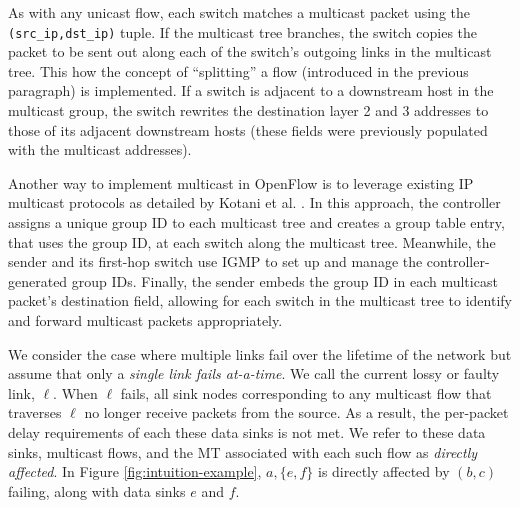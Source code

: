 As with any unicast flow, each switch matches a multicast packet using the {\tt(src\_ip,dst\_ip)} tuple.  If the multicast tree branches, the switch copies the packet 
to be sent out along each of the switch's outgoing links in the multicast tree.  This how the concept of ``splitting''  a flow (introduced in the previous paragraph) is implemented.
If a switch is adjacent to a downstream host in the multicast group, the switch rewrites the destination layer 2 and 3 addresses to those of its adjacent downstream hosts 
(these fields were previously populated with the multicast addresses). 

Another way to implement multicast in OpenFlow is to leverage existing IP multicast protocols as detailed by Kotani et al. \cite{Kotani12}.  
In this approach, the controller assigns a unique group ID to each multicast tree and creates a group table entry, that uses the group ID, at each switch along the multicast tree.  
Meanwhile, the sender and its first-hop switch use IGMP to set up and manage the controller-generated group IDs. Finally, the sender embeds the group ID in each multicast packet's destination 
field, allowing for each switch in the multicast tree to identify and forward multicast packets appropriately. 


We consider the case where multiple links fail over the lifetime of the network but assume that only a \emph{single link fails at-a-time}.
We call the current lossy or faulty link, $\ell$.  When $\ell$ fails, all sink nodes corresponding to any multicast flow that traverses $\ell$ no longer receive packets from the source. 
As a result, the per-packet delay requirements of each these data sinks is not met. 
We refer to these data sinks, multicast flows, and the MT associated with each such flow %
as \emph{directly affected}.  In Figure \ref{fig:intuition-example}, $a,\{e,f\}$ is directly affected by $(b,c)$ failing, along with data sinks $e$ and $f$.

